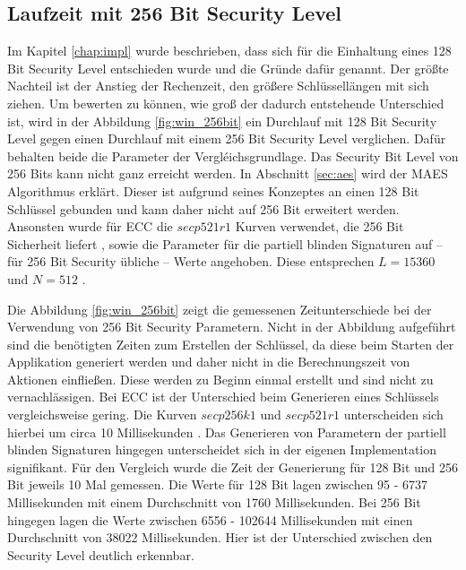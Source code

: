 \documentclass[
	fontsize=11pt,
	headings=small,
	parskip=half,           %
	bibliography=totoc,
	numbers=noenddot,       %
	open=any,               %
]{scrreprt}
\begin{document}
\subsection{Laufzeit mit 256 Bit Security Level}
\label{subsec:runTime256Bit}
Im Kapitel \ref{chap:impl} wurde beschrieben, dass sich für die Einhaltung eines 128 Bit Security Level entschieden wurde und die Gründe dafür genannt. Der größte Nachteil ist der Anstieg der Rechenzeit, den größere Schlüssellängen mit sich ziehen. Um bewerten zu können, wie groß der dadurch entstehende Unterschied ist, wird in der Abbildung \ref{fig:win_256bit} ein Durchlauf mit 128 Bit Security Level gegen einen Durchlauf mit einem 256 Bit Security Level verglichen. Dafür behalten beide die Parameter der Vergléichsgrundlage. Das Security Bit Level von 256 Bits kann nicht ganz erreicht werden. In Abschnitt \ref{sec:aes} wird der MAES Algorithmus erklärt. Dieser ist aufgrund seines Konzeptes an einen 128 Bit Schlüssel gebunden und kann daher nicht auf 256 Bit erweitert werden. Ansonsten wurde für ECC die $secp521r1$ Kurven verwendet, die 256 Bit Sicherheit liefert \cite{ecc-duka2020elliptic}, sowie die Parameter für die partiell blinden Signaturen auf -- für 256 Bit Security übliche -- Werte angehoben. Diese entsprechen $L=15360$ und $N=512$ \cite{elaine2016recommendation}.

Die Abbildung \ref{fig:win_256bit} zeigt die gemessenen Zeitunterschiede bei der Verwendung von 256 Bit Security Parametern. Nicht in der Abbildung aufgeführt sind die benötigten Zeiten zum Erstellen der Schlüssel, da diese beim Starten der Applikation generiert werden und daher nicht in die Berechnungszeit von Aktionen einfließen. Diese werden zu Beginn einmal erstellt und sind nicht zu vernachlässigen. Bei ECC ist der Unterschied beim Generieren eines Schlüssels vergleichsweise gering. Die Kurven $secp256k1$ und $secp521r1$ unterscheiden sich hierbei um circa 10 Millisekunden \cite{ecc-duka2020elliptic}. Das Generieren von Parametern der partiell blinden Signaturen hingegen unterscheidet sich in der eigenen Implementation signifikant. Für den Vergleich wurde die Zeit der Generierung für 128 Bit und 256 Bit jeweils 10 Mal gemessen. Die Werte für 128 Bit lagen zwischen 95 - 6737 Millisekunden mit einem Durchschnitt von 1760 Millisekunden. Bei 256 Bit hingegen lagen die Werte zwischen 6556 - 102644 Millisekunden mit einen Durchschnitt von 38022 Millisekunden. Hier ist der Unterschied zwischen den Security Level deutlich erkennbar.
\end{document}
